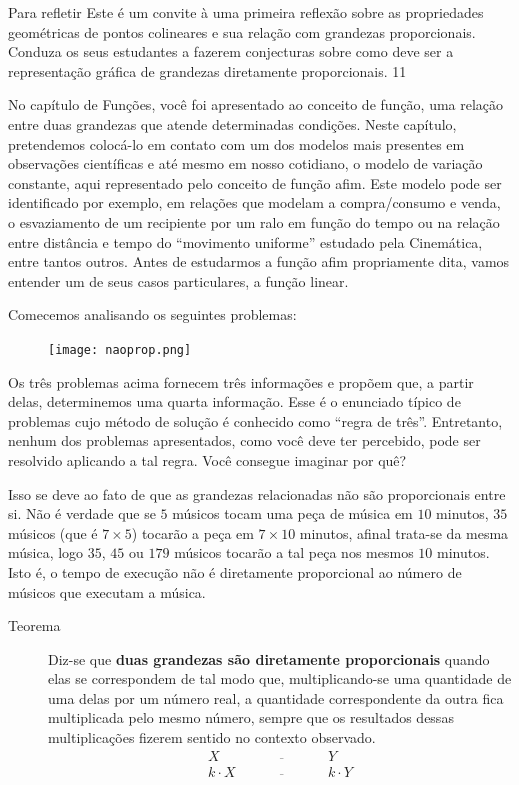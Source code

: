 \begin{sugestions}{Para refletir}
{
  Este é um convite à uma primeira reflexão sobre as propriedades geométricas de pontos colineares e sua relação com grandezas proporcionais. Conduza os seus estudantes a fazerem conjecturas sobre como deve ser a representação gráfica de grandezas diretamente proporcionais.
}{1}{1}
\end{sugestions}
\label{funcaolinear}
No capítulo de Funções, você foi apresentado ao conceito de função, uma relação entre duas grandezas que atende determinadas condições. Neste capítulo, pretendemos colocá-lo em contato com um dos modelos mais presentes em observações científicas e até mesmo em nosso cotidiano, o modelo de variação constante, aqui representado pelo conceito de função afim. Este modelo pode ser identificado por exemplo, em relações que modelam a compra/consumo e venda, o esvaziamento de um recipiente por um ralo em função do tempo ou na relação entre distância e tempo do “movimento uniforme” estudado pela Cinemática, entre tantos outros. Antes de estudarmos a função afim propriamente dita, vamos entender um de seus casos particulares, a função linear.

Comecemos analisando os seguintes problemas:

\begin{figure}[H]
\centering
\noindent\texttt{[image: naoprop.png]}
\end{figure}


Os três problemas acima fornecem três informações e propõem que, a partir delas, determinemos uma quarta informação. Esse é o enunciado típico de problemas cujo método de solução é conhecido como “regra de três”. Entretanto, nenhum dos problemas apresentados, como você deve ter percebido, pode ser resolvido aplicando a tal regra. Você consegue imaginar por quê?

Isso se deve ao fato de que as grandezas relacionadas não são proporcionais entre si. Não é verdade que se \(5\) músicos tocam uma peça de música em \(10\) minutos, \(35\) músicos (que é \(7 \times 5\)) tocarão a peça em \(7 \times 10\) minutos, afinal trata-se da mesma música, logo \(35\), \(45\) ou \(179\) músicos tocarão a tal peça nos mesmos \(10\) minutos. Isto é, o tempo de execução não é diretamente proporcional ao número de músicos que executam a música.

\begin{description}
\item[Teorema]
\leavevmode{}\label{\detokenize{AF107-0:term-grandezas-diretamente-proporcionais}}
Diz-se que \textbf{duas grandezas são diretamente proporcionais} quando elas se correspondem de tal modo que, multiplicando-se uma quantidade de uma delas por um número real, a quantidade correspondente da outra fica multiplicada pelo mesmo número, sempre que os resultados dessas multiplicações fizerem sentido no contexto observado.
\[\begin{array}{ccc}
X\quad &\overline{\quad \quad \quad}& \quad Y \\
k\cdot X \quad &\overline{\quad \quad \quad}& \quad k\cdot Y
\end{array}\]
\end{description}

